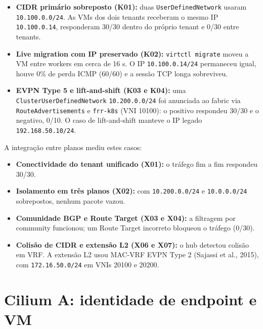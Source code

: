 \documentclass[12pt,openany,oneside,a4paper,chapter=TITLE,english,brazil]{abntex2}
\providecommand{\tightlist}{\setlength{\itemsep}{0pt}\setlength{\parskip}{0pt}}
\begin{document}
\begin{itemize}
\tightlist
\item
  \textbf{CIDR primário sobreposto (K01):} duas \texttt{User\allowbreak{}Defined\allowbreak{}Network} usaram \texttt{10.\allowbreak{}100.\allowbreak{}0.\allowbreak{}0/\allowbreak{}24}. As VMs dos dois tenants receberam o mesmo IP \texttt{10.\allowbreak{}100.\allowbreak{}0.\allowbreak{}14}, responderam 30/30 dentro do próprio tenant e 0/30 entre tenants.
\item
  \textbf{Live migration com IP preservado (K02):} \texttt{virtctl migrate} moveu a VM entre workers em cerca de 16 s. O IP \texttt{10.\allowbreak{}100.\allowbreak{}0.\allowbreak{}14/\allowbreak{}24} permaneceu igual, houve 0\% de perda ICMP (60/60) e a sessão TCP longa sobreviveu.
\item
  \textbf{EVPN Type 5 e lift-and-shift (K03 e K04):} uma \texttt{Cluster\allowbreak{}User\allowbreak{}Defined\allowbreak{}Network} \texttt{10.\allowbreak{}200.\allowbreak{}0.\allowbreak{}0/\allowbreak{}24} foi anunciada ao fabric via \texttt{Route\allowbreak{}Advertisements} e \texttt{frr-{}\allowbreak{}k8s} (VNI 10100): o positivo respondeu 30/30 e o negativo, 0/10. O caso de lift-and-shift manteve o IP legado \texttt{192.\allowbreak{}168.\allowbreak{}50.\allowbreak{}10/\allowbreak{}24}.
\end{itemize}

A integração entre planos mediu estes casos:

\begin{itemize}
\tightlist
\item
  \textbf{Conectividade do tenant unificado (X01):} o tráfego fim a fim respondeu 30/30.
\item
  \textbf{Isolamento em três planos (X02):} com \texttt{10.\allowbreak{}200.\allowbreak{}0.\allowbreak{}0/\allowbreak{}24} e \texttt{10.\allowbreak{}0.\allowbreak{}0.\allowbreak{}0/\allowbreak{}24} sobrepostos, nenhum pacote vazou.
\item
  \textbf{Comunidade BGP e Route Target (X03 e X04):} a filtragem por community funcionou; um Route Target incorreto bloqueou o tráfego (0/30).
\item
  \textbf{Colisão de CIDR e extensão L2 (X06 e X07):} o hub detectou colisão em VRF. A extensão L2 usou MAC-VRF EVPN Type 2 (Sajassi et al., 2015), com \texttt{172.\allowbreak{}16.\allowbreak{}50.\allowbreak{}0/\allowbreak{}24} em VNIs 20100 e 20200.
\end{itemize}

\section{Cilium A: identidade de endpoint e VM}\label{cilium-a-identidade-de-endpoint-e-vm}
\end{document}
